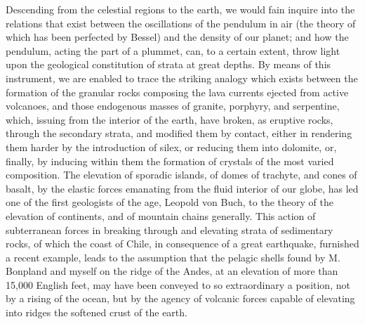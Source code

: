 Descending from the celestial regions to the earth, we would fain inquire into the relations that exist between the oscillations of the pendulum in air (the theory of which has been perfected by Bessel) and the density of our planet; and how the pendulum, acting the part of a plummet, can, to a certain extent, throw light upon the geological constitution of strata at great depths. By means of this instrument, we are enabled to trace the striking analogy which exists between the formation of the granular rocks composing the lava currents ejected from active volcanoes, and those endogenous masses of granite, porphyry, and serpentine, which, issuing from the interior of the earth, have broken, as eruptive rocks, through the secondary strata, and modified them by contact, either in rendering them harder by the introduction of silex, or reducing them into dolomite, or, finally, by inducing within them the formation of crystals of the most varied composition. The elevation of sporadic islands, of domes of trachyte, and cones of basalt, by the elastic forces emanating from the fluid interior of our globe, has led one of the first geologists of the age, Leopold von Buch, to the theory of the elevation of continents, and of mountain chains generally. This action of subterranean forces in breaking through and elevating strata of sedimentary rocks, of which the coast of Chile, in consequence of a great earthquake, furnished a recent example, leads to the assumption that the pelagic shells found by M. Bonpland and myself on the ridge of the Andes, at an elevation of more than 15,000 English feet, may have been conveyed to so extraordinary a position, not by a rising of the ocean, but by the agency of volcanic forces capable of elevating into ridges the softened crust of the earth. 

